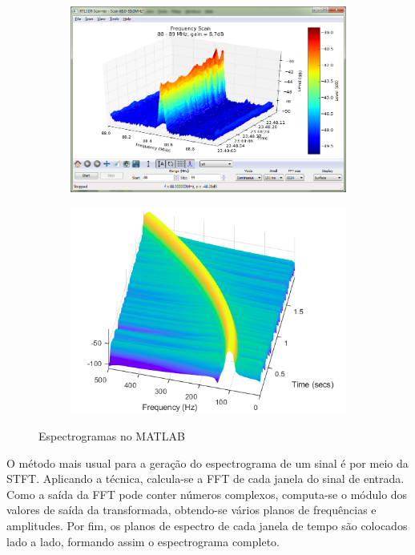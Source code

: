 \begin{figure}[h]
	\begin{subfigure}{0.5\textwidth}
		\includegraphics[scale=0.225]{pasta1_figuras/spectrogram2.png}
		\caption{}
	\end{subfigure}
	\hspace*{\fill} %
	\begin{subfigure}{0.5\textwidth}
	\includegraphics[scale=0.44]{pasta1_figuras/spectrogram3.png}
	\caption{}
	\end{subfigure}
	 \caption{Espectrogramas no MATLAB\rreg} \label{fig-spectrogram}
\end{figure}

O método mais usual para a geração do espectrograma de um sinal é por meio da STFT. Aplicando a técnica, calcula-se a FFT de cada janela do sinal de entrada. Como a saída da FFT pode conter números complexos, computa-se o módulo dos valores de saída da transformada, obtendo-se vários planos de frequências e amplitudes. Por fim, os planos de espectro de cada janela de tempo são colocados lado a lado, formando assim o espectrograma completo.


